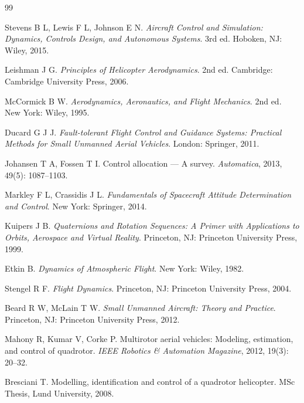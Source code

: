 \documentclass[a4paper,12pt]{ctexart}
\theoremstyle{plain}
\theoremstyle{definition}
\begin{document}
\begin{thebibliography}{99}

Stevens B L, Lewis F L, Johnson E N.
\textit{Aircraft Control and Simulation: Dynamics, Controls Design, and Autonomous Systems}.
3rd ed. Hoboken, NJ: Wiley, 2015.

Leishman J G.
\textit{Principles of Helicopter Aerodynamics}.
2nd ed. Cambridge: Cambridge University Press, 2006.

McCormick B W.
\textit{Aerodynamics, Aeronautics, and Flight Mechanics}.
2nd ed. New York: Wiley, 1995.

Ducard G J J.
\textit{Fault-tolerant Flight Control and Guidance Systems: Practical Methods for Small Unmanned Aerial Vehicles}.
London: Springer, 2011.

Johansen T A, Fossen T I.
Control allocation --- A survey.
\textit{Automatica}, 2013, 49(5): 1087--1103.

Markley F L, Crassidis J L.
\textit{Fundamentals of Spacecraft Attitude Determination and Control}.
New York: Springer, 2014.

Kuipers J B.
\textit{Quaternions and Rotation Sequences: A Primer with Applications to Orbits, Aerospace and Virtual Reality}.
Princeton, NJ: Princeton University Press, 1999.

Etkin B.
\textit{Dynamics of Atmospheric Flight}.
New York: Wiley, 1982.

Stengel R F.
\textit{Flight Dynamics}.
Princeton, NJ: Princeton University Press, 2004.

Beard R W, McLain T W.
\textit{Small Unmanned Aircraft: Theory and Practice}.
Princeton, NJ: Princeton University Press, 2012.

Mahony R, Kumar V, Corke P.
Multirotor aerial vehicles: Modeling, estimation, and control of quadrotor.
\textit{IEEE Robotics \& Automation Magazine}, 2012, 19(3): 20--32.

Bresciani T.
Modelling, identification and control of a quadrotor helicopter.
MSc Thesis, Lund University, 2008.


\end{thebibliography}
\end{document}
